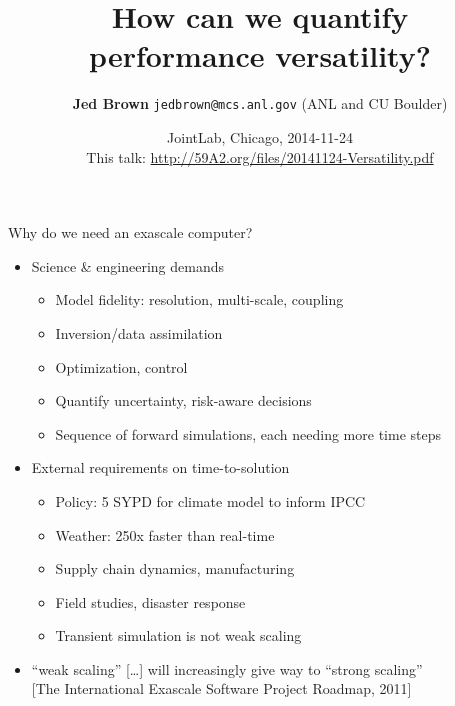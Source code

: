 \documentclass{beamer}
\title{How can we quantify \\ performance versatility?}
\author{{\bf Jed Brown} \texttt{jedbrown@mcs.anl.gov} (ANL and CU Boulder)}
\date{JointLab, Chicago, 2014-11-24 \\[1em]
{\small This talk: \url{http://59A2.org/files/20141124-Versatility.pdf}}}
\begin{document}
\lstset{language=C}
\normalem

\begin{frame}
  \titlepage
\end{frame}

\begin{frame}{Why do we need an exascale computer?}
  \begin{itemize}
  \item Science \& engineering demands
    \begin{itemize}
    \item Model fidelity: resolution, multi-scale, coupling
    \item Inversion/data assimilation
    \item Optimization, control
    \item Quantify uncertainty, risk-aware decisions
    \item Sequence of forward simulations, each needing more time steps
    \end{itemize}
  \item External requirements on time-to-solution
    \begin{itemize}
    \item Policy: 5 SYPD for climate model to inform IPCC
    \item Weather: 250x faster than real-time
    \item Supply chain dynamics, manufacturing
    \item Field studies, disaster response
    \item Transient simulation is not weak scaling
    \end{itemize}
  \item ``weak scaling'' [\ldots] will increasingly give way to ``strong scaling''\\
    {\small [The International Exascale Software Project Roadmap, 2011]}
  \end{itemize}
\end{frame}
\end{document}
